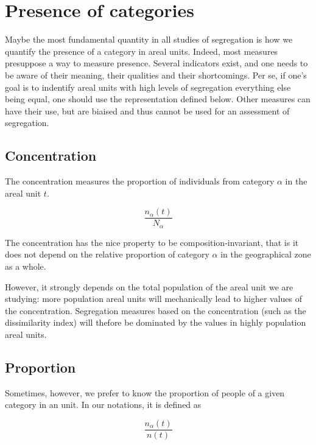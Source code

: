 \section{Presence of categories}
\label{sec:presence_of_categories}

Maybe the most fundamental quantity in all studies of segregation is how we
quantify the presence of a category in areal units. Indeed, most measures
presuppose a way to measure presence. Several indicators exist, and one needs to be
aware of their meaning, their qualities and their shortcomings. Per se, if one's
goal is to indentify areal units with high levels of segregation everything else
being equal, one should use the representation defined below. Other measures can
have their use, but are biaised and thus cannot be used for an assessment of
segregation.

\subsection{Concentration}
\label{sub:concentration}


The concentration measures the proportion of individuals from category $\alpha$
in the areal unit $t$. 

\begin{equation}
    \frac{n_\alpha(t)}{N_\alpha}
\end{equation}

The concentration has the nice property to be composition-invariant, that is it
does not depend on the relative proportion of category $\alpha$ in the
geographical zone as a whole. 

However, it strongly depends on the total population of the areal unit we are
studying: more population areal units will mechanically lead to higher values of
the concentration. Segregation measures based on the concentration (such as the
dissimilarity index) will thefore be dominated by the values in highly
population areal units.

\subsection{Proportion}
\label{sub:proportion}

Sometimes, however, we prefer to know the proportion of people of a given
category in an unit. In our notations, it is defined as 

\begin{equation}
    \frac{n_\alpha(t)}{n(t)}
\end{equation}

